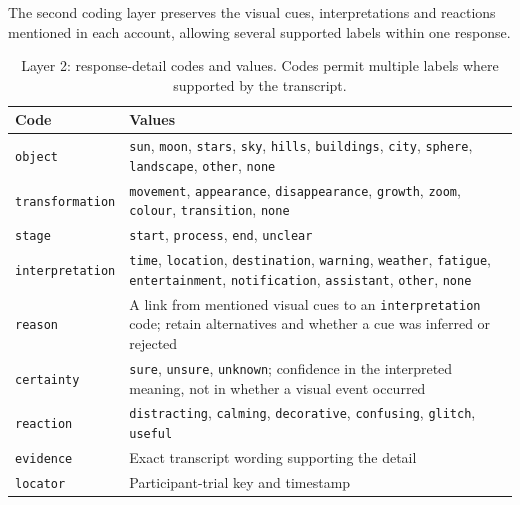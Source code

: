 \documentclass[
english,                 %
bibtex,                  %
includeExtraAbstracts, %
]{kththesis}
\newenvironment{evidenceblock}{\par\addvspace{6pt}\noindent\begin{minipage}{\linewidth}}{\end{minipage}\par\addvspace{6pt}}
\numberwithin{listing}{chapter}
\begin{document}
\begin{evidenceblock}
\normalsize
The second coding layer preserves the visual cues, interpretations and reactions mentioned in each account, allowing several supported labels within one response.

\begin{table}[H]
\centering
\scriptsize
\caption[Layer 2 response-detail codes]{Layer 2: response-detail codes and values. Codes permit multiple labels where supported by the transcript.}
\label{tab:rq3-detail-codebook}
\renewcommand{\arraystretch}{1.15}
\begin{tabularx}{\textwidth}{@{}l >{\raggedright\arraybackslash}X@{}}
\toprule
Code & Values \\
\midrule
\texttt{object} & \texttt{sun}, \texttt{moon}, \texttt{stars}, \texttt{sky}, \texttt{hills}, \texttt{buildings}, \texttt{city}, \texttt{sphere}, \texttt{landscape}, \texttt{other}, \texttt{none} \\
\texttt{transformation} & \texttt{movement}, \texttt{appearance}, \texttt{disappearance}, \texttt{growth}, \texttt{zoom}, \texttt{colour}, \texttt{transition}, \texttt{none} \\
\texttt{stage} & \texttt{start}, \texttt{process}, \texttt{end}, \texttt{unclear} \\
\texttt{interpretation} & \texttt{time}, \texttt{location}, \texttt{destination}, \texttt{warning}, \texttt{weather}, \texttt{fatigue}, \texttt{entertainment}, \texttt{notification}, \texttt{assistant}, \texttt{other}, \texttt{none} \\
\texttt{reason} & A link from mentioned visual cues to an \texttt{interpretation} code; retain alternatives and whether a cue was inferred or rejected \\
\texttt{certainty} & \texttt{sure}, \texttt{unsure}, \texttt{unknown}; confidence in the interpreted meaning, not in whether a visual event occurred \\
\texttt{reaction} & \texttt{distracting}, \texttt{calming}, \texttt{decorative}, \texttt{confusing}, \texttt{glitch}, \texttt{useful} \\
\texttt{evidence} & Exact transcript wording supporting the detail \\
\texttt{locator} & Participant-trial key and timestamp \\
\bottomrule
\end{tabularx}
\end{table}
\end{evidenceblock}
\end{document}
